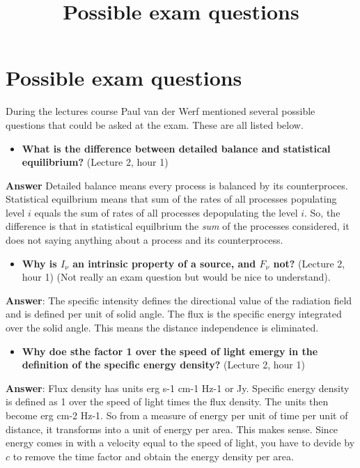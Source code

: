 \documentclass[11pt]{article}
\title{Possible exam questions}
\providecommand{\tightlist}{%
      \setlength{\itemsep}{0pt}\setlength{\parskip}{0pt}}
\begin{document}
    
    
    \maketitle
    
    

    
    \section{Possible exam questions}\label{possible-exam-questions}

During the lectures course Paul van der Werf mentioned several possible
questions that could be asked at the exam. These are all listed below.

    \begin{itemize}
\tightlist
\item
  \textbf{What is the difference between detailed balance and
  statistical equilibrium?} (Lecture 2, hour 1)
\end{itemize}

\textbf{Answer} Detailed balance means every process is balanced by its
counterproces. Statistical equilbrium means that sum of the rates of all
processes populating level \(i\) equals the sum of rates of all
processes depopulating the level \(i\). So, the difference is that in
statistical equilbrium the \emph{sum} of the processes considered, it
does not saying anything about a process and its counterprocess.

    \begin{itemize}
\tightlist
\item
  \textbf{Why is \(I_\nu\) an intrinsic property of a source, and
  \(F_\nu\) not?} (Lecture 2, hour 1) (Not really an exam question but
  would be nice to understand).
\end{itemize}

\textbf{Answer}: The specific intensity defines the directional value of
the radiation field and is defined per unit of solid angle. The flux is
the specific energy integrated over the solid angle. This means the
distance independence is eliminated.

    \begin{itemize}
\tightlist
\item
  \textbf{Why doe sthe factor 1 over the speed of light emergy in the
  definition of the specific energy density?} (Lecture 2, hour 1)
\end{itemize}

\textbf{Answer}: Flux density has units erg s-1 cm-1 Hz-1 or Jy.
Specific energy density is defined as 1 over the speed of light times
the flux density. The units then become erg cm-2 Hz-1. So from a measure
of energy per unit of time per unit of distance, it transforms into a
unit of energy per area. This makes sense. Since energy comes in with a
velocity equal to the speed of light, you have to devide by \(c\) to
remove the time factor and obtain the energy density per area.
\end{document}
